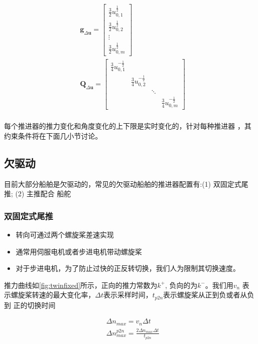 \begin{equation}
  \label{eq:qpsimple2}
  \begin{aligned}
    &\bm{g}_{\Delta \bm{u}}=
    \begin{bmatrix}
      \frac{3}{2} u_{0,1}^{\frac{1}{2}} \\
      \frac{3}{2} u_{0,2}^{\frac{1}{2}} \\
      \vdots \\
      \frac{3}{2} u_{0, m}^{\frac{1}{2}}
    \end{bmatrix} \\
    & \bm{Q}_{\Delta \bm{u}} =
    \begin{bmatrix}
      \frac{3}{4} u_{0,1}^{-\frac{1}{2}} & & & \\
      & \frac{3}{4} u_{0,2}^{-\frac{1}{2}} & & \\
      & & \ddots & \\
      & & & \frac{3}{4} u_{0,m}^{-\frac{1}{2}}
    \end{bmatrix} \\
  \end{aligned}
\end{equation}


每个推进器的推力变化和角度变化的上下限是实时变化的，针对每种推进器
，其约束条件将在下面几小节讨论。

\subsection{欠驱动}
目前大部分船舶是欠驱动的，常见的欠驱动船舶的推进器配置有:(1) 双固定式尾推; (2) 主推配合
船舵
\subsubsection{双固定式尾推}
\begin{itemize}
	\item 转向可通过两个螺旋桨差速实现
	\item 通常用伺服电机或者步进电机带动螺旋桨
	\item 对于步进电机，为了防止过快的正反转切换，我们人为限制其切换速度。
\end{itemize}

推力曲线如\ref{fig:twinfixed}所示，正向的推力常数为$k^+$, 负向的为$k^-$。我们用$v_n$
表示螺旋桨转速的最大变化率，$\Delta t$表示采样时间，$t_{p2n}$表示螺旋桨从正到负或者从负到
正的切换时间

\begin{equation}
  \begin{aligned}
    & \Delta n_{max} = v_n \Delta t \\
    & \Delta n_{max}^{p2n} = \frac{2 \Delta n_{max} \Delta t}{t_{p2n}}
  \end{aligned}
\end{equation}

